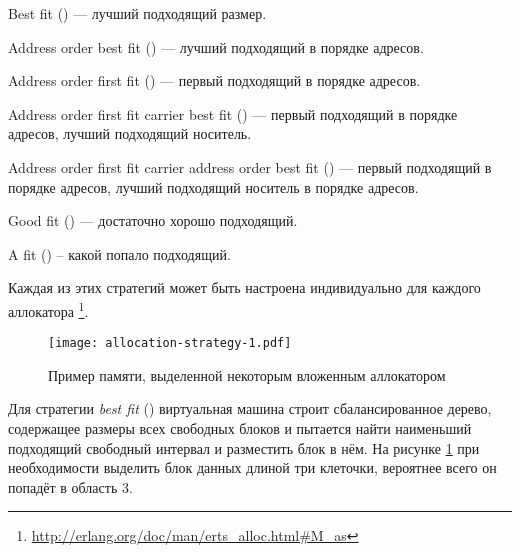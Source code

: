 \begin{enumerate*}
	\item Best fit () --- лучший подходящий размер.
	\item Address order best fit () --- лучший подходящий в порядке адресов.
	\item Address order first fit () --- первый подходящий в порядке адресов.
	\item Address order first fit carrier best fit () --- первый подходящий в порядке адресов, лучший подходящий носитель.
	\item Address order first fit carrier address order best fit () --- первый подходящий в порядке адресов, лучший подходящий носитель в порядке адресов.
	\item Good fit () --- достаточно хорошо подходящий.
	\item A fit () -- какой попало подходящий.
\end{enumerate*}

Каждая из этих стратегий может быть настроена индивидуально для каждого аллокатора \footnote{\href{http://erlang.org/doc/man/erts\_alloc.html\#M\_as}{http://erlang.org/doc/man/erts\_alloc.html\#M\_as}}.

\begin{figure}
  \texttt{[image: allocation-strategy-1.pdf]}%
  \centering%
	\caption{Пример памяти, выделенной некоторым вложенным аллокатором}
   \label{fig:allocation-strategy-1}
\end{figure}
\FloatBarrier

Для стратегии \emph{best fit} () виртуальная машина строит сбалансированное дерево, содержащее размеры всех свободных блоков и пытается найти наименьший подходящий свободный интервал и разместить блок в нём. На рисунке \ref{fig:allocation-strategy-1} при необходимости выделить блок данных длиной три клеточки, вероятнее всего он попадёт в область 3.

